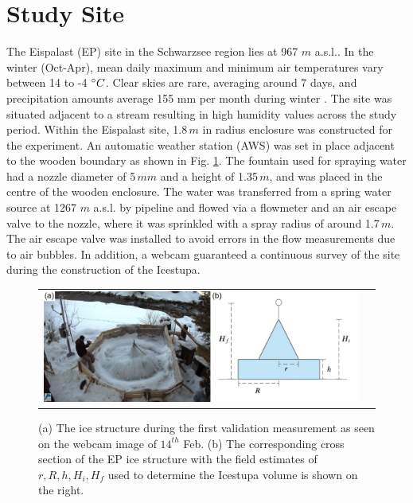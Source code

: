 \documentclass[utf8]{frontiersSCNS} %
\begin{document}
\section{Study Site}
The Eispalast (EP) site in the Schwarzsee region lies at 967 $m$ a.s.l.. In the winter (Oct-Apr), mean daily maximum
and minimum air temperatures vary between 14 to -4 $\degree C$. Clear skies are rare, averaging around 7 days, and
precipitation amounts average 155 mm per month during winter \citep{eispalast}. The site was situated adjacent to a
stream resulting in high humidity values across the study period. Within the Eispalast site, 1.8\,$m$ in radius
enclosure was constructed for the experiment. An automatic weather station (AWS) was set in place adjacent to the
wooden boundary as shown in Fig. \ref{fig:site}. The fountain used for spraying water had a nozzle diameter of 5\,$mm$
and a height of 1.35\,$m$, and was placed in the centre of the wooden enclosure. The water was transferred from a
spring water source at 1267 $m$ a.s.l. by pipeline and flowed via a flowmeter and an air escape valve to the nozzle,
where it was sprinkled with a spray radius of around 1.7\,$m$. The air escape valve was installed to avoid errors in
the flow measurements due to air bubbles. In addition, a webcam guaranteed a continuous survey of the site during the
construction of the Icestupa. 

\begin{figure}[htb] \centering \begin{tabular}{@{}cc@{}} \includegraphics[width=15cm]{./Figures/Figure_2.jpg} &
\end{tabular} \caption{(a) The ice structure during the first validation measurement as seen on the webcam image of
  $14^{th}$ Feb. (b) The corresponding cross section of the EP ice structure with the field estimates of $r, R,
  h, H_i, H_f$ used to determine the Icestupa volume is shown on the right.} \label{fig:site} \end{figure}
\end{document}

